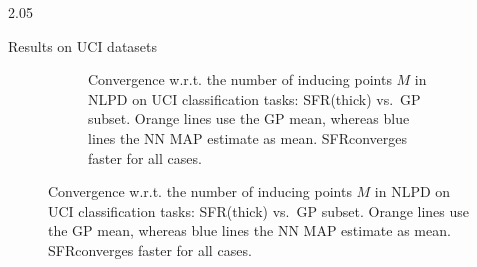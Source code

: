 \documentclass[final,12pt]{beamer}
\newcommand{\our}{SFR}
\newlength{\colwidth}
\begin{document}
\begin{frame}[t]
\begin{columns}
\begin{column}{2.05\colwidth}
\begin{block}{Results on UCI datasets}
\begin{figure}
\begin{subfigure}[b]{0.3\textwidth}
  \caption{\footnotesize Convergence w.r.t. the number of inducing points $M$ in NLPD on UCI classification tasks: \our (thick) vs.\ GP subset. Orange lines 
  use the GP mean, whereas blue lines 
the NN MAP estimate as mean. \our converges faster for all cases.}
\end{subfigure}
\end{figure}


\end{block}
\end{column}
\end{columns}
\end{frame}
\end{document}
